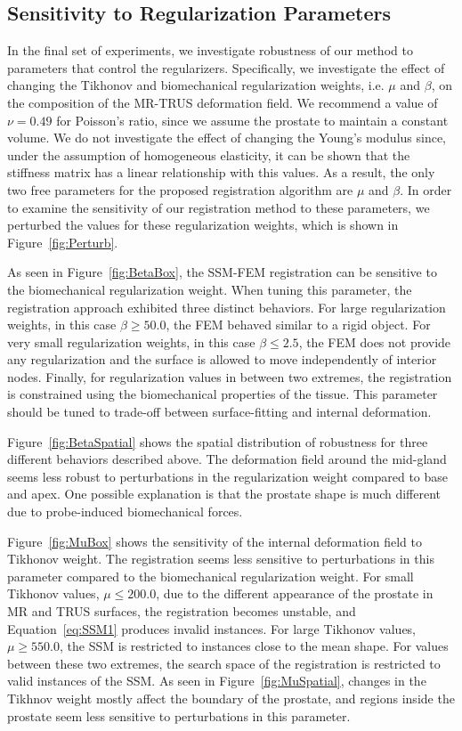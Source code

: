 \documentclass[journal]{IEEEtran}
\begin{document}
\subsection{Sensitivity to Regularization Parameters}\label{sec:exp3}
In the final set of experiments, we investigate robustness of our method to parameters that control the regularizers. Specifically, we investigate the effect of changing the Tikhonov and biomechanical regularization weights, i.e. $\mu$ and $\beta$, on the composition of the MR-TRUS deformation field. We recommend a value of $\nu=0.49$ for Poisson's ratio, since we assume the prostate to maintain a constant volume. We do not investigate the effect of changing the Young's modulus since, under the assumption of homogeneous elasticity, it can be shown that the stiffness matrix has a linear relationship with this values. As a result, the only two free parameters for the proposed registration algorithm are $\mu$ and $\beta$. In order to examine the sensitivity of our registration method to these parameters, we perturbed the values for these regularization weights, which is shown in Figure~\ref{fig:Perturb}.

As seen in Figure~\ref{fig:BetaBox}, the SSM-FEM registration can be sensitive to the biomechanical regularization weight. When tuning this parameter, the registration approach exhibited three distinct behaviors. For large regularization weights, in this case $\beta\geq50.0$, the FEM behaved similar to a rigid object. For very small regularization weights, in this case $\beta\leq2.5$, the FEM does not provide any regularization and the surface is allowed to move independently of interior nodes. Finally, for regularization values in between two extremes, the registration is constrained using the biomechanical properties of the tissue.  This parameter should be tuned to trade-off between surface-fitting and internal deformation.

Figure~\ref{fig:BetaSpatial} shows the spatial distribution of robustness for three different behaviors described above. The deformation field around the mid-gland seems less robust to perturbations in the regularization weight compared to base and apex. One possible explanation is that the prostate shape is much different due to probe-induced biomechanical forces.

Figure~\ref{fig:MuBox} shows the sensitivity of the internal deformation field to Tikhonov weight. The registration seems less sensitive to perturbations in this parameter compared to the biomechanical regularization weight. For small Tikhonov values, $\mu\leq200.0$, due to the different appearance of the prostate in MR and TRUS surfaces, the registration becomes unstable, and Equation~\ref{eq:SSM1} produces invalid instances. For large Tikhonov values, $\mu\geq550.0$, the SSM is restricted to instances close to the mean shape. For values between these two extremes, the search space of the registration is restricted to valid instances of the SSM. As seen in Figure~\ref{fig:MuSpatial}, changes in the Tikhnov weight mostly affect the boundary of the prostate, and regions inside the prostate seem less sensitive to perturbations in this parameter.
\end{document}
